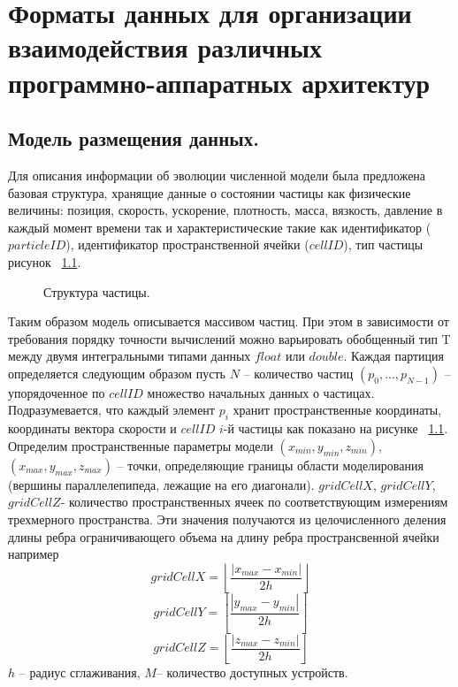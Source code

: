 \chapter{Форматы данных для организации взаимодействия различных программно-аппаратных архитектур}\label{ch:ch3}

\section{Модель размещения данных.}\label{sec:ch3/sect1}

Для описания информации об эволюции численной модели была предложена базовая структура, хранящие данные о состоянии частицы как физические величины: позиция, скорость, ускорение, плотность, масса, вязкость, давление в каждый момент времени так и характеристические такие как идентификатор (\(particleID\)), идентификатор пространственной ячейки (\(cellID\)), тип частицы рисунок ~\ref{fig:p_struct}.
\begin{figure}[ht]
  \caption{Структура частицы.}\label{fig:p_struct}
\end{figure}

Таким образом модель описывается массивом частиц. При этом в зависимости от требования порядку точности вычислений можно варьировать обобщенный тип T между двумя интегральными типами данных \(float\) или \(double\). Каждая партиция определяется следующим образом пусть \(N\) – количество частиц \((p_0,...,p_{N-1})\) – упорядоченное по \(cellID\) множество начальных данных о частицах. Подразумевается, что каждый элемент \(p_i\) хранит пространственные координаты, координаты вектора скорости и \(cellID\) \(i\)-й частицы как показано на рисунке ~\ref{fig:p_struct}. Определим пространственные параметры модели 
\((x_{min}, y_{min}, z_{min})\), \((x_{max}, y_{max}, z_{max})\) – точки, определяющие границы области моделирования (вершины параллелепипеда, лежащие на его диагонали).
\(gridCellX\), \(gridCellY\), \(gridCellZ\)- количество пространственных ячеек по соответствующим измерениям трехмерного пространства. Эти значения получаются из целочисленного деления длины ребра ограничивающего объема на длину ребра пространсвенной ячейки например
\[
gridCellX = \left \lfloor \frac{\left |x_{max} - x_{min}  \right |}{2h} \right \rfloor
\]
\[
gridCellY = \left \lfloor \frac{\left |y_{max} - y_{min}  \right |}{2h} \right \rfloor
\]
\[
gridCellZ = \left \lfloor \frac{\left |z_{max} - z_{min}  \right |}{2h} \right \rfloor
\]
\(h\) – радиус сглаживания,
\(M\)– количество доступных устройств.

